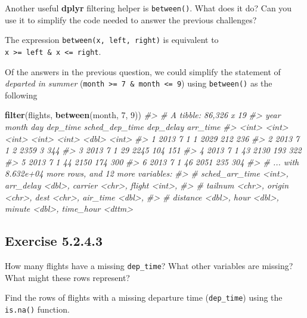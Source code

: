 \documentclass[]{book}
\newenvironment{Shaded}{\begin{snugshade}}{\end{snugshade}}
\newcommand{\CommentTok}[1]{\textcolor[rgb]{0.56,0.35,0.01}{\textit{#1}}}
\newcommand{\DecValTok}[1]{\textcolor[rgb]{0.00,0.00,0.81}{#1}}
\newcommand{\KeywordTok}[1]{\textcolor[rgb]{0.13,0.29,0.53}{\textbf{#1}}}
\newcommand{\NormalTok}[1]{#1}
\theoremstyle{plain}
\theoremstyle{remark}
\begin{document}
Another useful \textbf{dplyr} filtering helper is \texttt{between()}.
What does it do? Can you use it to simplify the code needed to answer
the previous challenges?

The expression \texttt{between(x,\ left,\ right)} is equivalent to
\texttt{x\ \textgreater{}=\ left\ \&\ x\ \textless{}=\ right}.

Of the answers in the previous question, we could simplify the statement
of \emph{departed in summer}
(\texttt{month\ \textgreater{}=\ 7\ \&\ month\ \textless{}=\ 9}) using
\texttt{between()} as the following

\begin{Shaded}
\begin{Highlighting}[]
\KeywordTok{filter}\NormalTok{(flights, }\KeywordTok{between}\NormalTok{(month, }\DecValTok{7}\NormalTok{, }\DecValTok{9}\NormalTok{))}
\CommentTok{#> # A tibble: 86,326 x 19}
\CommentTok{#>    year month   day dep_time sched_dep_time dep_delay arr_time}
\CommentTok{#>   <int> <int> <int>    <int>          <int>     <dbl>    <int>}
\CommentTok{#> 1  2013     7     1        1           2029       212      236}
\CommentTok{#> 2  2013     7     1        2           2359         3      344}
\CommentTok{#> 3  2013     7     1       29           2245       104      151}
\CommentTok{#> 4  2013     7     1       43           2130       193      322}
\CommentTok{#> 5  2013     7     1       44           2150       174      300}
\CommentTok{#> 6  2013     7     1       46           2051       235      304}
\CommentTok{#> # ... with 8.632e+04 more rows, and 12 more variables:}
\CommentTok{#> #   sched_arr_time <int>, arr_delay <dbl>, carrier <chr>, flight <int>,}
\CommentTok{#> #   tailnum <chr>, origin <chr>, dest <chr>, air_time <dbl>,}
\CommentTok{#> #   distance <dbl>, hour <dbl>, minute <dbl>, time_hour <dttm>}
\end{Highlighting}
\end{Shaded}

\hypertarget{exercise-5.2.4.3}{%
\subsection*{\texorpdfstring{Exercise
{5.2.4.3}}{Exercise 5.2.4.3}}\label{exercise-5.2.4.3}}

How many flights have a missing \texttt{dep\_time}? What other variables
are missing? What might these rows represent?

Find the rows of flights with a missing departure time
(\texttt{dep\_time}) using the \texttt{is.na()} function.
\end{document}

